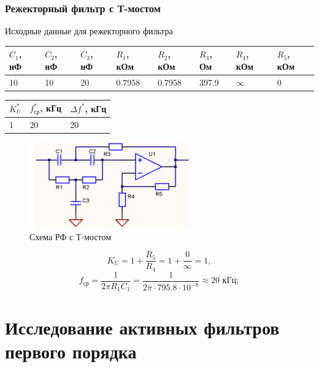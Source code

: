 \documentclass[a4paper, 12pt]{article}
\begin{document}
    \subsubsection{Режекторный фильтр с Т-мостом} \label{sec:rectoring}
    Исходные данные для режекторного фильтра
    \begin{center}
        \begin{tabular}{ | m{3.5em} | m{3.5em}| m{3.5em} | m{4em} | m{4em} | m{3.5em} | m{4em} | m{4em} |} 
        \hline
        $C_1$, нФ&$C_2$, нФ&$C_3$, нФ&$R_1$, кОм&$R_2$, кОм&$R_3$, Ом &$R_4$, кОм&$R_5$, кОм\\ 
        \hline
        10&10&20&0.7958&0.7958&397.9&$\infty$&0\\ 
        \hline
        \end{tabular}
    \end{center}
    \begin{center}
        \begin{tabular}{ | m{3.5em} | m{3.5em}| m{4.5em} |} 
        \hline
        $K_U^*$&$f_\text{ср}^*$, кГц&$\Delta f^*$, кГц\\ 
        \hline
        1&20&20\\ 
        \hline
        \end{tabular}
    \end{center}
    \begin{figure}[H]
        \centering
        \includegraphics{rectoring.png}
        \captionsetup{skip=0pt}
        \caption{Схема РФ с Т-мостом}
        \label{fig:null_scheme5}
    \end{figure}
    $$
    K_U=1+\dfrac{R_5}{R_4}=1+\dfrac{0}{\infty}=1,
    $$
    $$
    f_\text{ср}=\dfrac{1}{2\pi R_1C_1}=\dfrac{1}{2\pi\cdot795.8\cdot10^{-8}}\approx20\text{ кГц};
    $$


    \section{Исследование активных фильтров первого порядка}
\end{document}
